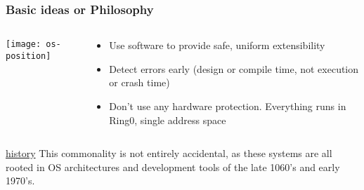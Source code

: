 \begin{frame}[plain]
	\frametitle{Basic ideas or Philosophy}
	
	
	
	\begin{columns}
		
		\begin{column}{.5\textwidth}
			
			\texttt{[image: os-position]}
			
		\end{column}
		
		\begin{column}{.5\textwidth}
			
			\begin{itemize}
				\item Use software to provide safe, uniform extensibility
				\item Detect errors early (design or compile time, not execution or
				crash time)
				
				\item Don’t use any hardware protection. Everything runs in Ring0, single address space
				
				
				
			\end{itemize}	
		\end{column}
		
		
	\end{columns}
	\begin{block}{\underline{history}}
		This commonality is not entirely accidental, as these systems are all
		rooted in OS architectures and development tools of the late 1060's and early 1970's. 
	\end{block}
	
\end{frame}
